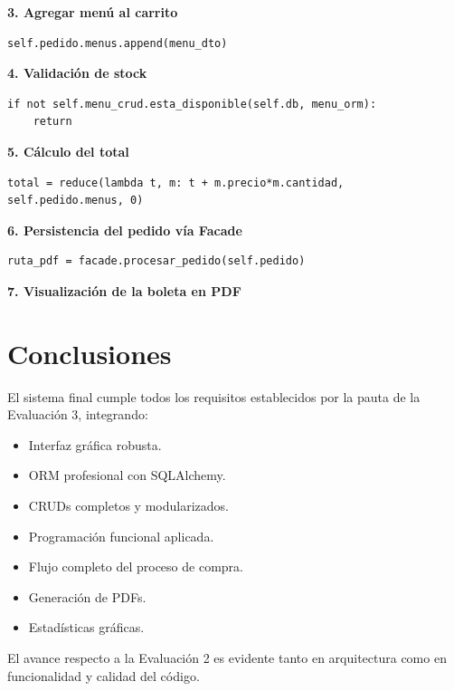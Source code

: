 \documentclass[11pt,letterpaper]{article}
\begin{document}
\textbf{3. Agregar menú al carrito}

\begin{verbatim}
self.pedido.menus.append(menu_dto)
\end{verbatim}

\textbf{4. Validación de stock}

\begin{verbatim}
if not self.menu_crud.esta_disponible(self.db, menu_orm):
    return
\end{verbatim}

\textbf{5. Cálculo del total}

\begin{verbatim}
total = reduce(lambda t, m: t + m.precio*m.cantidad, self.pedido.menus, 0)
\end{verbatim}

\textbf{6. Persistencia del pedido vía Facade}

\begin{verbatim}
ruta_pdf = facade.procesar_pedido(self.pedido)
\end{verbatim}

\textbf{7. Visualización de la boleta en PDF}

\section{Conclusiones}

El sistema final cumple todos los requisitos establecidos por la pauta de la Evaluación 3, integrando:

\begin{itemize}
    \item Interfaz gráfica robusta.
    \item ORM profesional con SQLAlchemy.
    \item CRUDs completos y modularizados.
    \item Programación funcional aplicada.
    \item Flujo completo del proceso de compra.
    \item Generación de PDFs.
    \item Estadísticas gráficas.
\end{itemize}

El avance respecto a la Evaluación 2 es evidente tanto en arquitectura como en funcionalidad y calidad del código.
\end{document}
